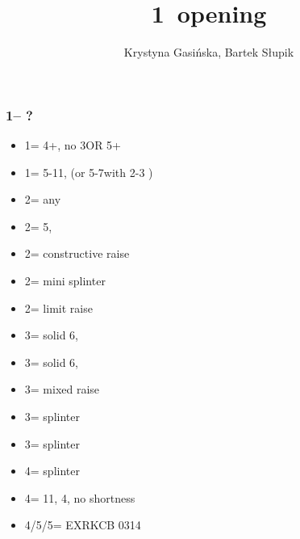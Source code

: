 \documentclass[12pt, a4paper]{article}
\title{1\major\ opening}
\author{Krystyna Gasińska, Bartek Słupik}
\begin{document}
\maketitle


\subsubsection*{1\hearts -- ?}
\begin{itemize}
    \item 1\spades = 4+\spades, no 3\hearts OR 5\hearts + \gf
    \item 1\nt = 5-11\hcp, (or 5-7\hcp with 2-3 \hearts)
    \item 2\clubs = any \gf
    \item 2\diams = 5\diams, \gf
    \item 2\hearts = constructive raise
    \item 2\spades = mini splinter
    \item 2\nt = limit raise
    \item 3\clubs = solid 6\clubs, \inv
    \item 3\diams = solid 6\diams, \inv
    \item 3\hearts = mixed raise
    \item 3\spades = splinter \spades
    \item 3\nt = splinter \diams
    \item 4\clubs = splinter \clubs
    \item 4\diams = 11\hcp, 4\hearts, no shortness
    \item 4\spades/5\clubs/5\diams = EXRKCB 0314
\end{itemize}
\end{document}
